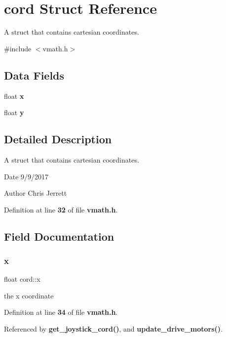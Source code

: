 \section{cord Struct Reference}
\label{structcord}


A struct that contains cartesian coordinates.  




{\ttfamily \#include $<$vmath.\+h$>$}

\subsection*{Data Fields}
\begin{DoxyCompactItemize}
\item 
float \textbf{ x}
\item 
float \textbf{ y}
\end{DoxyCompactItemize}


\subsection{Detailed Description}
A struct that contains cartesian coordinates. 

\begin{DoxyDate}{Date}
9/9/2017 
\end{DoxyDate}
\begin{DoxyAuthor}{Author}
Chris Jerrett 
\end{DoxyAuthor}


Definition at line \textbf{ 32} of file \textbf{ vmath.\+h}.



\subsection{Field Documentation}
\mbox{\label{structcord_a2eef9b681474b679cf87b0c20eced2cd}} 
\subsubsection{x}
{\footnotesize\ttfamily float cord\+::x}

the x coordinate 

Definition at line \textbf{ 34} of file \textbf{ vmath.\+h}.



Referenced by \textbf{ get\+\_\+joystick\+\_\+cord()}, and \textbf{ update\+\_\+drive\+\_\+motors()}.

